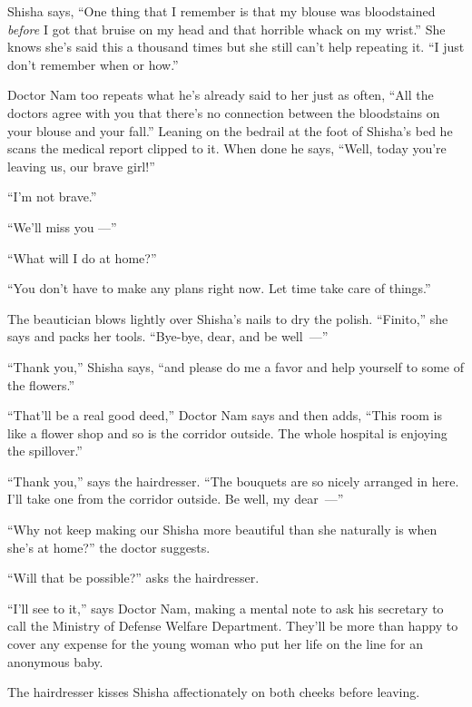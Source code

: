 \documentclass[twoside,11pt,openany]{book}
\begin{document}
Shisha says, ``One thing that I remember is that my blouse was bloodstained \textit{before} I got that
bruise on my head and that horrible whack on my wrist.'' She knows she's said this a thousand times but
she still can't help repeating it. ``I just don't remember when or how.''

Doctor Nam too repeats what he's already said to her just as often, ``All the doctors agree with you that
there's no connection between the bloodstains on your blouse and your fall.'' Leaning on the bedrail at
the foot of Shisha's bed he scans the medical report clipped to it. When done he says, ``Well, today
you're leaving us, our brave girl!''

``I'm not brave.''

``We'll miss you ---''

``What will I do at home?''

``You don't have to make any plans right now. Let time take care of things.''

The beautician blows lightly over Shisha's nails to dry the polish. ``Finito,''
she says and packs her tools. ``Bye-bye, dear, and be \hbox{well ---''}

``Thank you,'' Shisha says, ``and please do me a favor and help yourself to some
of the flowers.''

``That'll be a real good deed,'' Doctor Nam says and then adds, ``This room is
like a flower shop and so is the corridor outside. The whole hospital is enjoying the spillover.''

``Thank you,'' says the hairdresser. ``The bouquets are so nicely arranged in
here. I'll take one from the corridor outside. Be well, my dear~---''

``Why not keep making our Shisha more beautiful than she naturally is when she's at home?''
the doctor suggests.

``Will that be possible?'' asks the hairdresser.

``I'll see to it,'' says Doctor Nam, making a mental note to ask his secretary to call the
Ministry of Defense Welfare Department. They'll be more than happy to cover any expense for the young woman who put her
life on the line for an anonymous baby.

The hairdresser kisses Shisha affectionately on both cheeks before leaving.
\end{document}
